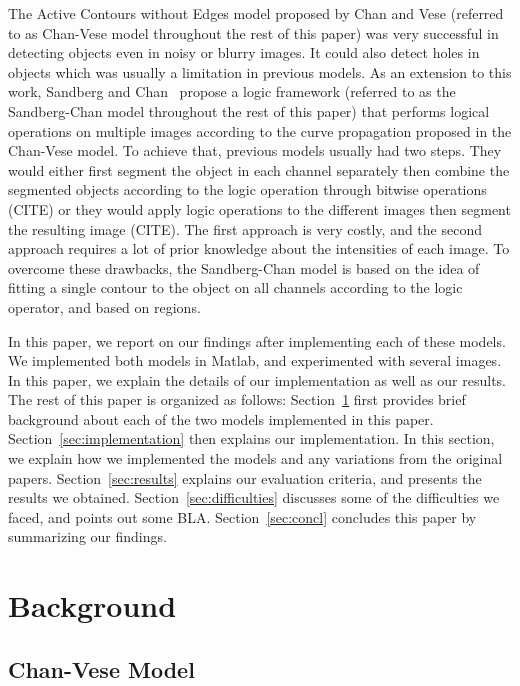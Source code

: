 \documentclass[10pt,twocolumn,letterpaper]{article}
\begin{document}
The Active Contours without Edges model proposed by Chan and Vese (referred to as Chan-Vese model throughout the rest of this paper) was very successful in
detecting objects even in noisy or blurry images. It could also detect holes in objects which was usually a limitation in previous models. As an extension to
this work, Sandberg and Chan~\cite{sandberg2005logic} propose a logic framework (referred to as the Sandberg-Chan model throughout the rest of this
paper) that  performs logical operations on multiple images according to the curve propagation proposed in the Chan-Vese model. To achieve that, previous models
usually had two steps. They would either first segment the object in each channel separately then combine the segmented objects according to the logic operation
through bitwise operations (CITE) or they would apply logic operations to the different images then segment the resulting image (CITE). The first approach is
very costly, and the second approach requires a lot of prior knowledge about the intensities of each image. To overcome these drawbacks, the Sandberg-Chan
model is based on the idea of fitting a single contour to the object on all channels according to the logic operator, and based on regions.

In this paper, we report on our findings after implementing each of these models. We implemented both models in Matlab, and experimented with several images.
In this paper, we explain the details of our implementation as well as our results. The rest of this paper is organized as follows: Section~\ref{sec:bg} first
provides brief background about each of the two models implemented in this paper. Section~\ref{sec:implementation} then explains our implementation. In this
section, we explain how we implemented the models and any variations from the original papers. Section~\ref{sec:results} explains our evaluation criteria, and
presents the results we obtained. Section~\ref{sec:difficulties} discusses some of the difficulties we faced, and points out some BLA. Section~\ref{sec:concl}
concludes this paper by summarizing our findings.


\section{Background}
\label{sec:bg}

\subsection{Chan-Vese Model}
\label{sec:chan-vese}
\end{document}
